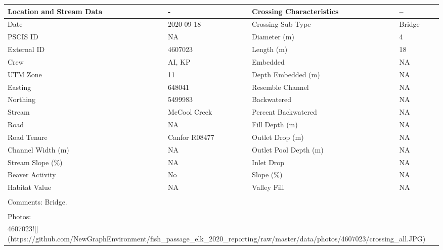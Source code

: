\documentclass[
]{book}
\begin{document}
\begin{tabular}{l|l|l|l}
\hline
Location and Stream Data & - & Crossing Characteristics & --\\
\hline
Date & 2020-09-18 & Crossing Sub Type & Bridge\\
\hline
PSCIS ID & NA & Diameter (m) & 4\\
\hline
External ID & 4607023 & Length (m) & 18\\
\hline
Crew & AI, KP & Embedded & NA\\
\hline
UTM Zone & 11 & Depth Embedded (m) & NA\\
\hline
Easting & 648041 & Resemble Channel & NA\\
\hline
Northing & 5499983 & Backwatered & NA\\
\hline
Stream & McCool Creek & Percent Backwatered & NA\\
\hline
Road & NA & Fill Depth (m) & NA\\
\hline
Road Tenure & Canfor R08477 & Outlet Drop (m) & NA\\
\hline
Channel Width (m) & NA & Outlet Pool Depth (m) & NA\\
\hline
Stream Slope (\%) & NA & Inlet Drop & NA\\
\hline
Beaver Activity & No & Slope (\%) & NA\\
\hline
Habitat Value & NA & Valley Fill & NA\\
\hline
\multicolumn{4}{l}{\textsuperscript{} Comments: Bridge.}\\
\multicolumn{4}{l}{\textsuperscript{} Photos:}\\
\multicolumn{4}{l}{4607023![](https://github.com/NewGraphEnvironment/fish\_passage\_elk\_2020\_reporting/raw/master/data/photos/4607023/crossing\_all.JPG)}\\
\end{tabular}
\end{document}
